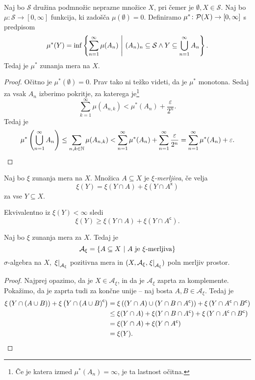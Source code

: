 \begin{trditev}
Naj bo $\mathcal{S}$ družina podmnožic neprazne množice $X$, pri
čemer je $\emptyset, X \in \mathcal{S}$. Naj bo
$\mu \colon \mathcal{S} \to [0, \infty]$ funkcija, ki zadošča
$\mu(\emptyset) = 0$. Definiramo
$\mu^* \colon \mathcal{P}(X) \to [0, \infty]$ s predpisom
\[
\mu^*(Y) =
\inf \left\{\sum_{n=1}^\infty \mu(A_n)~\middle\vert~(A_n)_n \subseteq \mathcal{S} \land
Y \subseteq \bigcup_{n=1}^\infty A_n\right\}.
\]
Tedaj je $\mu^*$ zunanja mera na $X$.
\end{trditev}

\begin{proof}
Očitno je $\mu^*(\emptyset) = 0$. Prav tako ni težko videti, da je
$\mu^*$ monotona. Sedaj za vsak $A_n$ izberimo pokritje, za
katerega je\footnote{Če je katera izmed $\mu^*(A_n) = \infty$, je
ta lastnost očitna.}
\[
\sum_{k=1}^\infty \mu(A_{n,k}) <
\mu^*(A_n) + \frac{\varepsilon}{2^n}.
\]
Tedaj je
\[
\mu^* \left(\bigcup_{n=1}^\infty A_n\right) \leq
\sum_{n,k \in \mathbb{N}} \mu(A_{n,k}) <
\sum_{n=1}^\infty \mu^*(A_n) +
\sum_{n=1}^\infty \frac{\varepsilon}{2^n} =
\sum_{n=1}^\infty \mu^*(A_n) + \varepsilon. \qedhere
\]
\end{proof}

\begin{definicija}
Naj bo $\xi$ zunanja mera na $X$. Množica $A \subseteq X$ je
\emph{$\xi$-merljiva}, če velja
\[
\xi(Y) = \xi(Y \cap A) + \xi(Y \cap A^{\mathsf{x}})
\]
za vse $Y \subseteq X$.
\end{definicija}

\begin{opomba}
Ekvivalentno iz $\xi(Y) < \infty$ sledi
\[
\xi(Y) \geq \xi(Y \cap A) + \xi(Y \cap A^{\mathsf{c}}).
\]
\end{opomba}

\begin{izrek}[Carathéodory]
Naj bo $\xi$ zunanja mera za $X$. Tedaj je
\[
\mathcal{A}_\xi =
\left\{A \subseteq X~\middle\vert~\text{$A$ je $\xi$-merljiva}\right\}
\]
$\sigma$-algebra na $X$, $\left. \xi\right|_{\mathcal{A}_\xi}^{}$ pozitivna
mera in $(X, \mathcal{A}_\xi, \left. \xi\right|_{\mathcal{A}_\xi}^{})$ poln
merljiv prostor.
\end{izrek}

\begin{proof}
Najprej opazimo, da je $X \in \mathcal{A}_\xi$, in da je
$\mathcal{A}_\xi$ zaprta za komplemente. Pokažimo, da je zaprta
tudi za končne unije -- naj bosta $A, B \in \mathcal{A}_\xi$. Tedaj
je
\begin{align*}
\xi \left(Y \cap \left(A \cup B\right)\right) +
\xi \left(Y \cap \left(A \cup B\right)^\mathsf{c}\right) &=
\xi \left((Y \cap A) \cup (Y \cap B \cap A^\mathsf{c})\right) +
\xi \left(Y \cap A^\mathsf{c} \cap B^\mathsf{c}\right)
\\
&\leq
\xi(Y \cap A) + \xi(Y \cap B \cap A^\mathsf{c}) +
\xi \left(Y \cap A^\mathsf{c} \cap B^\mathsf{c}\right)
\\
&=
\xi(Y \cap A) + \xi(Y \cap A^\mathsf{c})
\\
&=
\xi(Y).
\end{align*}
\end{proof}

